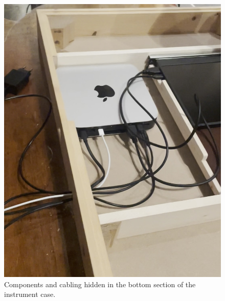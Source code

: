 
\begin{figure}
    \centering
    \includegraphics[width=0.8\linewidth]{src/images/mac-mini.jpg}
    \caption{Components and cabling hidden in the bottom section of the instrument case.}
    \label{fig:mac-mini}
\end{figure}



